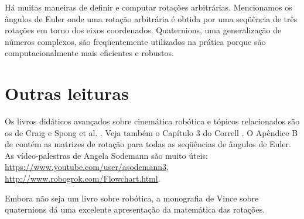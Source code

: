 Há muitas maneiras de definir e computar rotações arbitrárias. Mencionamos os ângulos de Euler onde uma rotação arbitrária é obtida por uma seqüência de três rotações em torno dos eixos coordenados. Quaternions, uma generalização de números complexos, são freqüentemente utilizados na prática porque são computacionalmente mais eficientes e robustos.

\section{Outras leituras}

Os livros didáticos avançados sobre cinemática robótica e tópicos relacionados são os de Craig \cite{craig} e Spong et al. \cite{spong}. Veja também o Capítulo 3 do Correll \cite{correll}. O Apêndice B de \cite{craig} contém as matrizes de rotação para todas as seqüências de ângulos de Euler. As vídeo-palestras de Angela Sodemann são muito úteis:\\
\url{https://www.youtube.com/user/asodemann3},\\
\url{http://www.robogrok.com/Flowchart.html}.

Embora não seja um livro sobre robótica, a monografia de Vince sobre quaternions \cite{vince} dá uma excelente apresentação da matemática das rotações.
